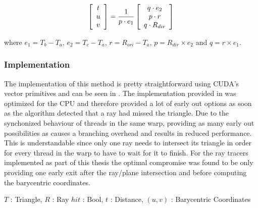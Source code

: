 \begin{displaymath}
  \left[\begin{array}{c} t \\ u \\ v \end{array}\right] = \frac{1}{p \cdot e_1} 
  \left[\begin{array}{c} q \cdot e_2 \\ p \cdot r \\ q \cdot R_{dir} \end{array}\right]
\end{displaymath}

where $e_1 = T_b - T_a$, $e_2 = T_c - T_a$, $r = R_{ori} - T_a$, $p = R_{dir} \times  e_2$
and $q = r \times  e_1$.

\subsubsection{Implementation}

The implementation of this method is pretty straightforward using CUDA's vector
primitives and can be seen in . The implementation
provided in  was optimized for the CPU and therefore
provided a lot of early out options as soon as the algorithm detected that a ray
had missed the triangle. Due to the synchonized behaviour of threads in the same
warp, providing as many early out possibilities as 
causes a branching overhead and results in reduced performance. This is
understandable since only one ray needs to intersect its triangle in order for
every thread in the warp to have to wait for it to finish. For the ray tracers
implemented as part of this thesis the optimal compromise was found to be only
providing one early exit after the ray/plane intersection and before computing
the barycentric coordinates.

\begin{algorithm}
  \caption{Möller-Trumbore ray/triangle intersection test}
  \label{alg:moellerTrumbore}
  \begin{algorithmic}
              {$T$ : Triangle, $R$ : Ray}
              {$hit$ : Bool, $t$ : Distance, $(u,v)$ : Barycentric Coordinates}
              {
                \ELSE
                \ENDIF
              }
  \end{algorithmic}
\end{algorithm}


